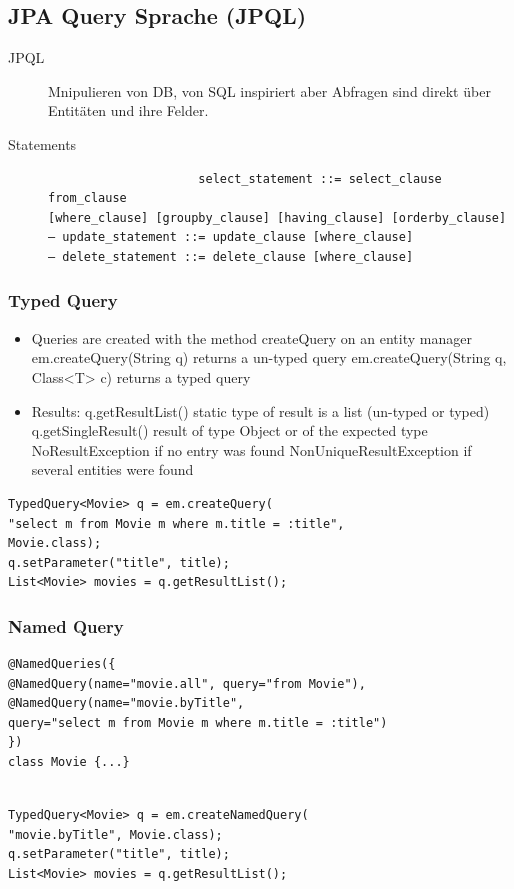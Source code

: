 \documentclass[a4paper,10pt]{scrreprt}
\begin{document}
\subsection{JPA Query Sprache (JPQL)}

\begin{description}
 \item [JPQL] Mnipulieren von DB, von SQL inspiriert aber Abfragen sind direkt über Entitäten und ihre Felder.
 \item [Statements] \begin{verbatim}
                     select_statement ::= select_clause from_clause
[where_clause] [groupby_clause] [having_clause] [orderby_clause]
– update_statement ::= update_clause [where_clause]
– delete_statement ::= delete_clause [where_clause]
                    \end{verbatim}
                    \end{description}

\subsubsection{Typed Query}
\begin{itemize}
\item  Queries are created with the method createQuery on an entity manager
\subitem  em.createQuery(String q)  returns a un-typed query
\subitem em.createQuery(String q, Class<T> c)  returns a typed query
\item  Results:
\subitem  q.getResultList()  static type of result is a list (un-typed or typed)
\subitem  q.getSingleResult()  result of type Object or of the expected type
\subsubitem NoResultException if no entry was found
\subsubitem NonUniqueResultException if several entities were found 
\end{itemize}

\begin{lstlisting}[caption=TypedQuery Example]
 TypedQuery<Movie> q = em.createQuery(
"select m from Movie m where m.title = :title",
Movie.class);
q.setParameter("title", title);
List<Movie> movies = q.getResultList();
\end{lstlisting}
\subsubsection{Named Query}
\begin{lstlisting}[caption=Query auf Entitätsklassen]
@NamedQueries({
@NamedQuery(name="movie.all", query="from Movie"),
@NamedQuery(name="movie.byTitle",
query="select m from Movie m where m.title = :title")
})
class Movie {...}
 
\end{lstlisting}
\begin{lstlisting}[caption=Query auf EntitätsManager]
 TypedQuery<Movie> q = em.createNamedQuery(
"movie.byTitle", Movie.class);
q.setParameter("title", title);
List<Movie> movies = q.getResultList();
\end{lstlisting}
\end{document}
